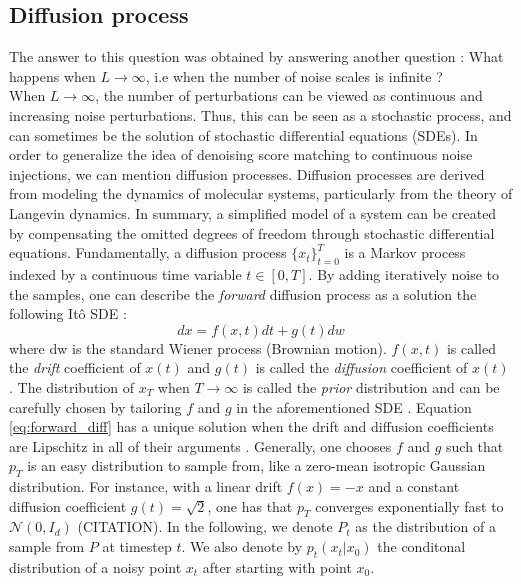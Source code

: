 \subsection{Diffusion process}
The answer to this question was obtained by answering another question : What happens when $L \rightarrow \infty $, i.e when the number of noise scales is infinite ? 
\\
When $L \rightarrow \infty$, the number of perturbations can be viewed as continuous and increasing noise perturbations. Thus, this can be seen as a stochastic process, and can sometimes be the solution of stochastic differential equations (SDEs). In order to generalize the idea of denoising score matching to continuous noise injections, we can mention diffusion processes. 
Diffusion processes are derived from modeling the dynamics of molecular systems, particularly from the theory of Langevin dynamics. In summary, a simplified model of a system can be created by compensating the omitted degrees of freedom through stochastic differential equations.
Fundamentally, a diffusion process $\{x_{t}\}_{t=0}^{T}$ is a Markov process indexed by a continuous time variable $t \in [0,T]$. By adding iteratively  noise to the samples, one can describe the \textit{forward} diffusion process as a solution the following Itô SDE : 
\begin{equation}\label{eq:forward_diff}
    dx = f(x,t)dt + g(t)dw 
\end{equation}
where dw is the standard Wiener process (Brownian motion). $f(x,t)$ is called the \textit{drift} coefficient of $x(t)$ and $g(t)$ is called the \textit{diffusion} coefficient of $x(t)$. The distribution of $x_{T}$  when $T \rightarrow \infty$ is called the \textit{prior} distribution and can be carefully chosen by tailoring $f$ and $g$ in the aforementioned SDE \citep{song2021scorebasedgenerativemodelingstochastic}.
Equation \ref{eq:forward_diff} has a unique solution when the drift and diffusion coefficients are Lipschitz in all of their arguments \citep{oksendal2003stochastic}. Generally, one chooses $f$ and $g$ such that $p_{T}$ is an easy distribution to sample from, like a zero-mean isotropic Gaussian distribution. 
For instance, with a linear drift $f(x) = -x$ and a constant diffusion coefficient $g(t) = \sqrt{2}$, one has that $p_{T}$ converges exponentially fast to $\mathcal{N}(0,I_{d})$ (CITATION).
In the following, we denote $P_{t}$ as the distribution of a sample from $P$ at timestep $t$. We also denote by $p_{t}(x_{t}|x_{0})$ the conditonal distribution of a noisy point $x_{t}$ after starting with point $x_{0}$.

